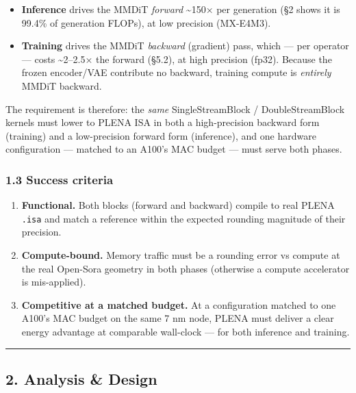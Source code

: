 \documentclass[
  10pt,
]{article}
\providecommand{\tightlist}{%
  \setlength{\itemsep}{0pt}\setlength{\parskip}{0pt}}
\begin{document}
\begin{itemize}
\tightlist
\item
  \textbf{Inference} drives the MMDiT \emph{forward} \textasciitilde150×
  per generation (§2 shows it is 99.4\% of generation FLOPs), at low
  precision (MX-E4M3).
\item
  \textbf{Training} drives the MMDiT \emph{backward} (gradient) pass,
  which --- per operator --- costs \textasciitilde2--2.5× the forward
  (§5.2), at high precision (fp32). Because the frozen encoder/VAE
  contribute no backward, training compute is \emph{entirely} MMDiT
  backward.
\end{itemize}

The requirement is therefore: the \emph{same} SingleStreamBlock /
DoubleStreamBlock kernels must lower to PLENA ISA in both a
high-precision backward form (training) and a low-precision forward form
(inference), and one hardware configuration --- matched to an A100's MAC
budget --- must serve both phases.

\subsubsection{1.3 Success criteria}\label{success-criteria}

\begin{enumerate}
\def\labelenumi{\arabic{enumi}.}
\tightlist
\item
  \textbf{Functional.} Both blocks (forward and backward) compile to real
  PLENA \texttt{.isa} and match a reference within the expected rounding
  magnitude of their precision.
\item
  \textbf{Compute-bound.} Memory traffic must be a rounding error vs
  compute at the real Open-Sora geometry in both phases (otherwise a
  compute accelerator is mis-applied).
\item
  \textbf{Competitive at a matched budget.} At a configuration matched to
  one A100's MAC budget on the same 7 nm node, PLENA must deliver a clear
  energy advantage at comparable wall-clock --- for both inference and
  training.
\end{enumerate}

\begin{center}\rule{0.5\linewidth}{0.5pt}\end{center}

\subsection{2. Analysis \& Design}\label{analysis-and-design}
\end{document}
